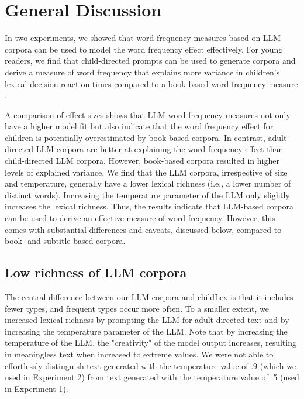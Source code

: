 \documentclass[doc, a4paper]{apa7}
\begin{document}
\section*{General Discussion}

In two experiments, we showed that word frequency measures based on LLM corpora can be used to model the word frequency effect effectively. For young readers, we find that child-directed prompts can be used to generate corpora and derive a measure of word frequency that explains more variance in children's lexical decision reaction times compared to a book-based word frequency measure \citep[childLex; ][]{schroeder_childlex_2015}. 

A comparison of effect sizes shows that LLM word frequency measures not only have a higher model fit but also indicate that the word frequency effect for children is potentially overestimated by book-based corpora. In contrast, adult-directed LLM corpora are better at explaining the word frequency effect than child-directed LLM corpora. However, book-based corpora resulted in higher levels of explained variance. We find that the LLM corpora, irrespective of size and temperature, generally have a lower lexical richness (i.e., a lower number of distinct words). Increasing the temperature parameter of the LLM only slightly increases the lexical richness. Thus, the results indicate that LLM-based corpora can be used to derive an effective measure of word frequency. However, this comes with substantial differences and caveats, discussed below, compared to book- and subtitle-based corpora.  


\subsection*{Low richness of LLM corpora}

The central difference between our LLM corpora and childLex is that it includes fewer types, and frequent types occur more often. To a smaller extent, we increased lexical richness by prompting the LLM for adult-directed text and by increasing the temperature parameter of the LLM. Note that by increasing the temperature of the LLM, the "creativity" of the model output increases, resulting in meaningless text when increased to extreme values. We were not able to effortlessly distinguish text generated with the temperature value of .9 (which we used in Experiment 2) from text generated with the temperature value of .5 (used in Experiment 1).  
\end{document}
